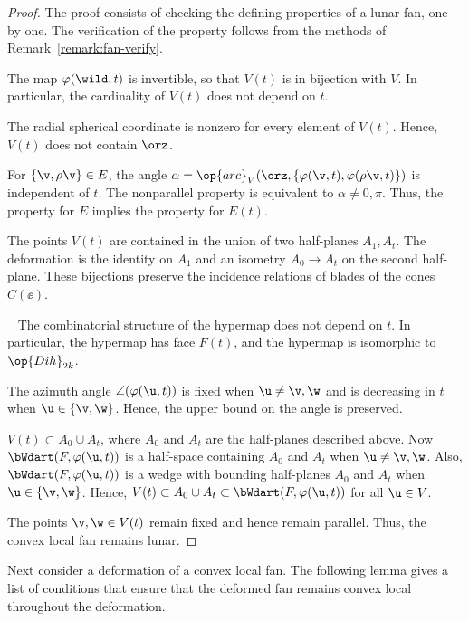 \begin{proof} The proof consists of checking the defining properties
  of a lunar fan, one by one.  The verification of the property
   follows from the methods of
  Remark~\ref{remark:fan-verify}.

The map $\varphi(\wild,t)$ is invertible, so that $V(t)$ is in
bijection with $V$.  In particular, the cardinality of $V(t)$ does not depend
on $t$.

 The radial spherical coordinate is nonzero for every
element of $V(t)$.  Hence, $V(t)$ does not contain $\orz$.

 For $\{\v,\rho \v\}\in E$, the angle
$\alpha=\op{arc}_V(\orz,\{\varphi(\v,t),\varphi(\rho \v,t)\})$ is
independent of $t$.  The nonparallel property is equivalent to
$\alpha\ne0,\pi$.  Thus, the  property for $E$ implies
the property for $E(t)$.

 The points $V(t)$ are contained in the union of
two half-planes $A_1,A_t$.  The deformation is the identity on $A_1$
and an isometry $A_0\to A_t$ on the second half-plane.  These
bijections preserve the incidence relations of blades of the cones
$C(\ee)$.

~ The combinatorial structure of
the hypermap does not depend on $t$.  In particular, the hypermap has
face $F(t)$, and the hypermap is isomorphic to $\op{Dih}_{2k}$.

 The azimuth angle $\angle(\varphi(\u,t))$ is fixed when
$\u\ne \v,\w$ and is decreasing in $t$ when $\u\in \{\v,\w\}$.
Hence, the upper bound on the angle is preserved.

 $V(t)\subset A_0\cup A_t$, where $A_0$ and $A_t$ are
the half-planes described above.  Now $\bWdart(F,\varphi(\u,t))$ is
a half-space containing $A_0$ and $A_t$ when $\u\ne \v,\w$.  Also,
$\bWdart(F,\varphi(\u,t))$ is a wedge with bounding half-planes
$A_0$ and $A_t$ when $\u\in \{\v,\w\}$.  Hence, $V(t)\subset A_0\cup
A_t\subset \bWdart(F,\varphi(\u,t))$ for all $\u\in V$.

 The points $\v,\w\in V(t)$ remain fixed and hence
remain parallel.  Thus, the convex local fan remains lunar.
\end{proof}
%

Next consider a deformation of a convex local fan.  The following lemma
gives a list of conditions that ensure that the deformed fan remains
convex local throughout the deformation.


